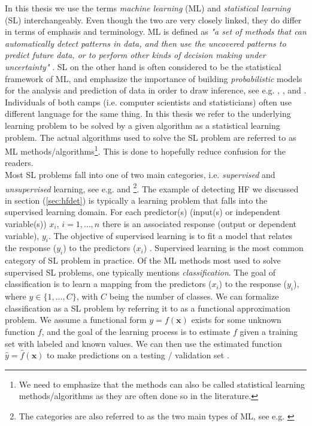 \documentclass[../thesis.tex]{subfiles}
\begin{document}
\noindent In this thesis we use the terms \textit{machine learning} (ML) and \textit{statistical learning} (SL) interchangeably. Even though the two are very closely linked, they do differ in terms of emphasis and terminology. ML is defined as \textit{"a set of methods that can automatically detect patterns in data, and then use the uncovered patterns to predict future data, or to perform other kinds of decision making under uncertainty"} \citep{muphy2012machine}. SL on the other hand is often considered to be the statistical framework of ML, and emphasize the importance of building \textit{probabilistic} models for the analysis and prediction of data in order to draw inference, see e.g. \cite{friedman2009elements}, \cite{muphy2012machine}, \cite{james2013introduction} and \cite{wasserman2013all}. Individuals of both camps (i.e. computer scientists and statisticians) often use different language for the same thing. In this thesis we refer to the underlying learning problem to be solved by a given algorithm as a statistical learning problem. The actual algorithms used to solve the SL problem are referred to as ML methods/algorithms\footnote{We need to emphasize that the methods can also be called statistical learning methods/algorithms as they are often done so in the literature.}. This is done to hopefully reduce confusion for the readers.\\
\indent Most SL problems fall into one of two main categories, i.e. \textit{supervised} and \textit{unsupervised} learning, see e.g. \cite{friedman2009elements} and \cite{james2013introduction}\footnote{The categories are also referred to as the two main types of ML, see e.g. \cite{muphy2012machine}}. The example of detecting  HF we discussed in section (\ref{sec:hfdet}) is typically a learning problem that falls into the supervised learning domain. For each predictor(s) (input(s) or independent variable(s)) $x_i$, $i= 1,\hdots,n$ there is an associated response (output or dependent variable), $y_i$. The objective of supervised learning is to fit a model that relates the response ($y_i$) to the predictors ($x_i$) \citep{james2013introduction}. Supervised learning is the most common category of SL problem in practice. Of the ML methods most used to solve supervised SL problems, one typically mentions \textit{classification}. The goal of classification is to learn a mapping from the predictors ($x_i$) to the response ($y_i$), where $y \in \{ 1, \hdots, C\}$, with $C$ being the number of classes. We can formalize classification as a SL problem by referring it to as a functional approximation problem. We assume a functional form $y = f(\mathbf{x})$ exists for some unknown function $f$, and the goal of the learning process is to estimate $f$ given a training set with labeled and known values. We can then use the estimated function $\hat{y} = \hat{f} (\mathbf{x})$ to make predictions on a testing / validation set \citep{muphy2012machine}.\\
\end{document}
